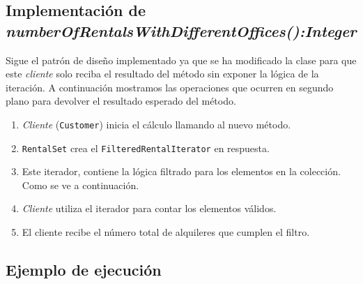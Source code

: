 \newpage %

\subsection{Implementación de \textit{numberOfRentalsWithDifferentOffices():Integer}}

Sigue el patrón de diseño implementado ya que se ha modificado la clase para que este \emph{cliente} solo reciba el resultado del método 
sin exponer la lógica de la iteración. A continuación mostramos las operaciones que ocurren en segundo plano para devolver el resultado esperado del método.
\begin{enumerate}
    \item \emph{Cliente} (\texttt{Customer}) inicia el cálculo llamando al nuevo método.
    \item \texttt{RentalSet} crea el \texttt{FilteredRentalIterator} en respuesta.
    \item Este iterador, contiene la lógica filtrado para los elementos en la colección. Como se ve a continuación.
    
    \item \emph{Cliente} utiliza el iterador para contar los elementos válidos.
    \item El cliente recibe el número total de alquileres que cumplen el filtro.
\end{enumerate}
\newpage

\newpage %

\subsection{Ejemplo de ejecución}


